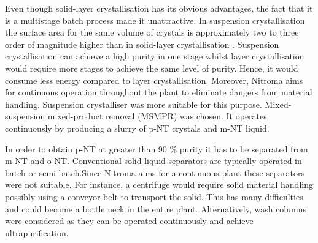 Even though solid-layer crystallisation has its obvious advantages, the fact that it is a multistage batch process made it unattractive. In suspension crystallisation the surface area for the same volume of crystals is approximately two to three order of magnitude higher than in solid-layer crystallisation \cite{noauthor_types_nodate}. Suspension crystallisation can achieve a high purity in one stage whilst layer crystallisation would require more stages to achieve the same level of purity. Hence, it would consume less energy compared to layer crystallisation. Moreover, Nitroma aims for continuous operation throughout the plant to eliminate dangers from material handling. Suspension crystalliser was more suitable for this purpose. Mixed-suspension mixed-product removal (MSMPR) was chosen. It operates continuously by producing a slurry of p-NT crystals and m-NT liquid.

In order to obtain p-NT at greater than 90 \% purity it has to be separated from m-NT and o-NT. Conventional solid-liquid separators are typically operated in batch or semi-batch.Since Nitroma aims for a continuous plant these separators were not suitable. For instance, a centrifuge would require  solid material handling possibly using a conveyor belt to transport the solid. This has many difficulties and could become a bottle neck in the entire plant. Alternatively, wash columns were considered as they can be operated continuously and achieve ultrapurification. 

